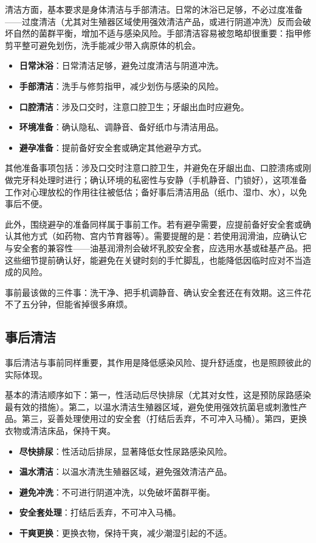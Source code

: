 \documentclass[12pt,UTF8]{ctexbook}
\newcommand{\keyword}[1]{\textbf{#1}}
\begin{document}
清洁方面，基本要求是身体清洁与手部清洁。日常的沐浴已足够，不必过度准备——过度清洁（尤其对生殖器区域使用强效清洁产品，或进行阴道冲洗）反而会破坏自然的菌群平衡，增加不适与感染风险。手部清洁容易被忽略却很重要：指甲修剪平整可避免划伤，洗手能减少带入病原体的机会。

\begin{itemize}
  \item \keyword{日常沐浴}：日常清洁足够，避免过度清洁与阴道冲洗。
  \item \keyword{手部清洁}：洗手与修剪指甲，减少划伤与感染的风险。
  \item \keyword{口腔清洁}：涉及口交时，注意口腔卫生；牙龈出血时应避免。
  \item \keyword{环境准备}：确认隐私、调静音、备好纸巾与清洁用品。
  \item \keyword{避孕准备}：提前备好安全套或确定其他避孕方式。
\end{itemize}

其他准备事项包括：涉及口交时注意口腔卫生，并避免在牙龈出血、口腔溃疡或刚做完牙科处理时进行；确认环境的私密性与安静（手机静音、门锁好），这项准备工作对心理放松的作用往往被低估；备好事后清洁用品（纸巾、湿巾、水），以免事后不便。

此外，围绕避孕的准备同样属于事前工作。若有避孕需要，应提前备好安全套或确认其他方式（如药物、宫内节育器等）。需要提醒的是：若使用润滑油，应确认它与安全套的兼容性——油基润滑剂会破坏乳胶安全套，应选用水基或硅基产品。把这些细节提前确认好，能避免在关键时刻的手忙脚乱，也能降低因临时应对不当造成的风险。

\begin{tcolorbox}[colback=pink!5!white,colframe=red!50!black,title=贴心小叮咛]
事前最该做的三件事：洗干净、把手机调静音、确认安全套还在有效期。这三件花不了五分钟，但能省掉很多麻烦。
\end{tcolorbox}
\subsection{事后清洁}

事后清洁与事前同样重要，其作用是降低感染风险、提升舒适度，也是照顾彼此的实际体现。

基本的清洁顺序如下：第一，性活动后尽快排尿（尤其对女性，这是预防尿路感染最有效的措施）。第二，以温水清洁生殖器区域，避免使用强效抗菌皂或刺激性产品。第三，妥善处理使用过的安全套（打结后丢弃，不可冲入马桶）。第四，更换衣物或清洁床品，保持干爽。

\begin{itemize}
  \item \keyword{尽快排尿}：性活动后排尿，显著降低女性尿路感染风险。
  \item \keyword{温水清洁}：以温水清洗生殖器区域，避免强效清洁产品。
  \item \keyword{避免冲洗}：不可进行阴道冲洗，以免破坏菌群平衡。
  \item \keyword{安全套处理}：打结后丢弃，不可冲入马桶。
  \item \keyword{干爽更换}：更换衣物，保持干爽，减少潮湿引起的不适。
\end{itemize}
\end{document}
